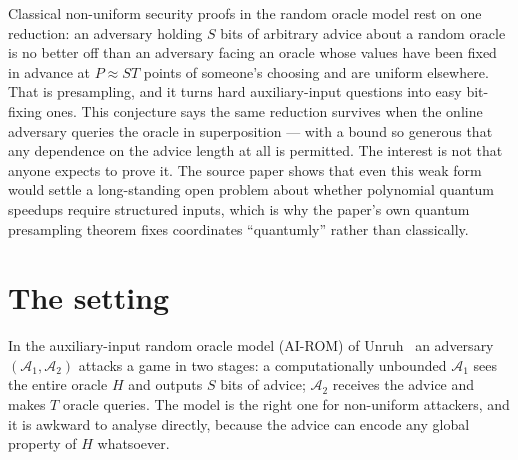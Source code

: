 \documentclass{aicr-conjecture}
\newcommand{\Adv}{\mathcal{A}}
\begin{document}

\vspace{0.4em}

\begin{informalconjecture}
Classical non-uniform security proofs in the random oracle model rest
on one reduction: an adversary holding $S$ bits of arbitrary advice
about a random oracle is no better off than an adversary facing an
oracle whose values have been fixed in advance at $P \approx ST$ points
of someone's choosing and are uniform elsewhere. That is presampling,
and it turns hard auxiliary-input questions into easy bit-fixing ones.
This conjecture says the same reduction survives when the online
adversary queries the oracle in superposition --- with a bound so
generous that any dependence on the advice length at all is permitted.
The interest is not that anyone expects to prove it. The source paper
shows that even this weak form would settle a long-standing open
problem about whether polynomial quantum speedups require structured
inputs, which is why the paper's own quantum presampling theorem fixes
coordinates ``quantumly'' rather than classically.
\end{informalconjecture}

\section{The setting}\label{sec:setting}

In the auxiliary-input random oracle model (AI-ROM) of
Unruh~\cite{Unr07} an adversary $(\Adv_{1}, \Adv_{2})$ attacks a game
in two stages: a computationally unbounded $\Adv_{1}$ sees the entire
oracle $H$ and outputs $S$ bits of advice; $\Adv_{2}$ receives the
advice and makes $T$ oracle queries. The model is the right one for
non-uniform attackers, and it is awkward to analyse directly, because
the advice can encode any global property of $H$ whatsoever.
\end{document}
